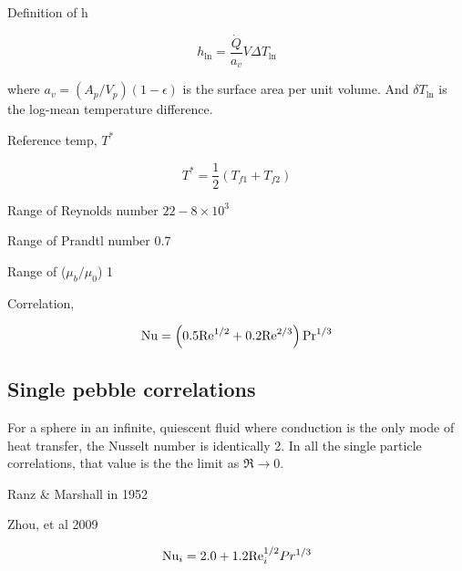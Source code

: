 Definition of h

\begin{equation}
	h_{\ln} = \frac{\dot{Q}}{a_v}V\Delta T_{\ln}
\end{equation}

where $a_v = (A_p/V_p)(1-\epsilon)$ is the surface area per unit volume. And $\delta T_{\ln}$ is the log-mean temperature difference.

Reference temp, $T^*$

\begin{equation}
	T^* = \frac{1}{2}(T_{f1} + T_{f2})
\end{equation}

Range of Reynolds number
$22-8 \times 10^3$

Range of Prandtl number
0.7

Range of ($\mu_b/\mu_0$)
1

Correlation,

\begin{equation}
	\mathrm{Nu} = \left( 0.5 \mathrm{Re}^{1/2} + 0.2\mathrm{Re}^{2/3} \right)\mathrm{Pr}^{1/3}
\end{equation}




\subsection{Single pebble correlations}

For a sphere in an infinite, quiescent fluid where conduction is the only mode of heat transfer, the Nusselt number is identically 2. In all the single particle correlations, that value is the the limit as $\Re \rightarrow 0$. 

Ranz \& Marshall in 1952 

Zhou, et al 2009

\begin{equation}
	\mathrm{Nu}_i = 2.0 + 1.2\mathrm{Re}_i^{1/2}Pr^{1/3}
\end{equation}